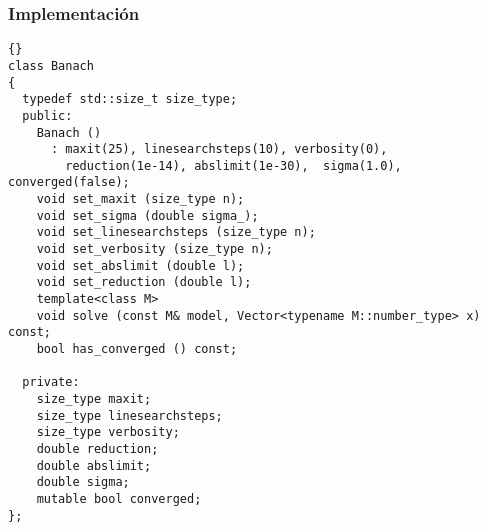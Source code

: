 \documentclass[a4paper,11pt]{article}
\theoremstyle{definition}
\begin{document}
\subsubsection{Implementación}
{\footnotesize{\begin{lstlisting}{}
class Banach
{
  typedef std::size_t size_type;
  public:
    Banach ()
      : maxit(25), linesearchsteps(10), verbosity(0),
        reduction(1e-14), abslimit(1e-30),  sigma(1.0), converged(false);
    void set_maxit (size_type n);
    void set_sigma (double sigma_);
    void set_linesearchsteps (size_type n);
    void set_verbosity (size_type n);
    void set_abslimit (double l);
    void set_reduction (double l);
    template<class M>
    void solve (const M& model, Vector<typename M::number_type> x) const;
    bool has_converged () const;

  private:
    size_type maxit;
    size_type linesearchsteps;
    size_type verbosity;
    double reduction;
    double abslimit;
    double sigma;
    mutable bool converged;
};
\end{lstlisting}}}
\end{document}
